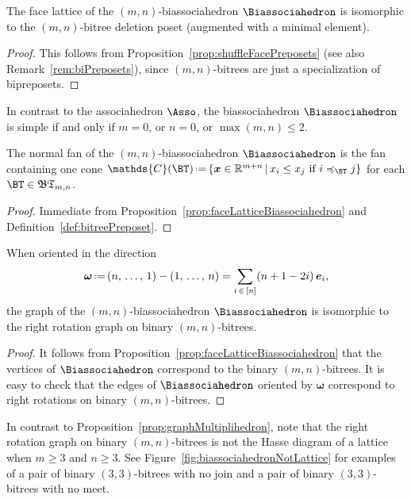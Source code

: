 \documentclass[AHL,Unicode,longabstracts,published]{cedram}
\newcommand{\R}{\mathbb{R}}
\renewcommand{\b}[1]{\boldsymbol{#1}}
\newcommand{\f}[1]{\mathfrak{#1}}
\newcommand{\eqdef}{\mbox{\,\raisebox{0.2ex}{\scriptsize\ensuremath{\mathrm:}}\ensuremath{=}\,}}
\newcommand{\polytope}[1]{\mathds{#1}}
\begin{document}
\begin{prop}\label{prop:faceLatticeBiassociahedron}
The face lattice of the $(m,n)$-biassociahedron $\Biassociahedron$ is isomorphic to the $(m,n)$-bitree deletion poset (augmented with a minimal element).
\end{prop}

\begin{proof}
This follows from Proposition~\ref{prop:shuffleFacePreposets} (see also Remark~\ref{rem:biPreposets}), since $(m,n)$-bitrees are just a specialization of bipreposets.
\end{proof}

\begin{rema}\label{rem:simpleBiassociahedron}
In contrast to the associahedron $\Asso$, the biassociahedron $\Biassociahedron$ is simple if and only if $m = 0$, or $n = 0$, or $\max(m,n) \le 2$.
\end{rema}

\begin{prop}\label{prop:fanBiassociahedron}
The normal fan of the $(m,n)$-biassociahedron $\Biassociahedron$ is the fan containing one cone $\polytope{C}(\BT) \eqdef \{\b{x} \in \R^{m+n}\,|\,x_i \le x_j \text{ if } i \preccurlyeq_{\BT} j\}$ for each ${\BT \in \f{BT}_{m,n}}$.
\end{prop}

\begin{proof}
Immediate from Proposition~\ref{prop:faceLatticeBiassociahedron} and Definition~\ref{def:bitreePreposet}.
\end{proof}

\begin{prop}\label{prop:graphBiassociahedron}
When oriented in the direction
\[
{\b{\omega} \eqdef (n,\,\dots,\,1) - (1,\,\dots,\,n) = \sum_{i\,\in\,[n]} (n+1-2i) \, \b{e}_i},
\]
the graph of the $(m,n)$-biassociahedron $\Biassociahedron$ is isomorphic to the right rotation graph on binary $(m,n)$-bitrees.
\end{prop}

\begin{proof}
It follows from Proposition~\ref{prop:faceLatticeBiassociahedron} that the vertices of $\Biassociahedron$ correspond to the binary $(m,n)$-bitrees. It is easy to check that the edges of $\Biassociahedron$ oriented by $\b{\omega}$ correspond to right rotations on binary $(m,n)$-bitrees.
\end{proof}

\begin{rema}\label{rem:noBiTamari}
In contrast to Proposition~\ref{prop:graphMultiplihedron}, note that the right rotation graph on binary $(m,n)$-bitrees is not the Hasse diagram of a lattice when $m \ge 3$ and $n \ge 3$. See Figure~\ref{fig:biassociahedronNotLattice} for examples of a pair of binary $(3,3)$-bitrees with no join and a pair of binary $(3,3)$-bitrees with no meet.
\end{rema}
\end{document}
